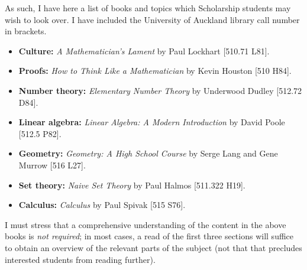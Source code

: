 \documentclass[a4paper]{amsart}
\theoremstyle{definition}
\theoremstyle{remark}
\begin{document}
As such, I have here a list of books and topics which Scholarship students may wish to look over. I have included the University of Auckland
library call number in brackets.
\begin{itemize}
  \item \textbf{Culture:} \emph{A Mathematician's Lament} by Paul Lockhart [510.71 L81].
  \item \textbf{Proofs:} \emph{How to Think Like a Mathematician} by Kevin Houston [510 H84].
  \item \textbf{Number theory:} \emph{Elementary Number Theory} by Underwood Dudley [512.72 D84].
  \item \textbf{Linear algebra:} \emph{Linear Algebra: A Modern Introduction} by David Poole [512.5 P82].
  \item \textbf{Geometry:} \emph{Geometry: A High School Course} by Serge Lang and Gene Murrow [516 L27].
  \item \textbf{Set theory:} \emph{Naive Set Theory} by Paul Halmos [511.322 H19].
  \item \textbf{Calculus:} \emph{Calculus} by Paul Spivak [515 S76].
\end{itemize}

I must stress that a comprehensive understanding of the content in the above books is \emph{not required}; in most cases, a read of the first three
sections will suffice to obtain an overview of the relevant parts of the subject (not that that precludes interested students from reading further).
\end{document}
